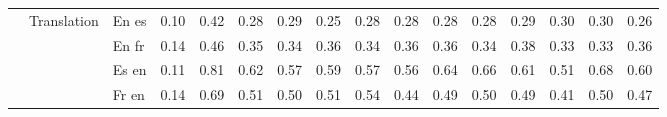\begin{center}
\begin{longtable}{lllrrrrrrrrrrrrr}
\cline{2-16}
 & \multirow[t]{4}{*}{Translation} & En es & 0.10 & 0.42 & 0.28 & 0.29 & 0.25 & 0.28 & 0.28 & 0.28 & 0.28 & 0.29 & 0.30 & 0.30 & 0.26 \\
 &  & En fr & 0.14 & 0.46 & 0.35 & 0.34 & 0.36 & 0.34 & 0.36 & 0.36 & 0.34 & 0.38 & 0.33 & 0.33 & 0.36 \\
 &  & Es en & 0.11 & 0.81 & 0.62 & 0.57 & 0.59 & 0.57 & 0.56 & 0.64 & 0.66 & 0.61 & 0.51 & 0.68 & 0.60 \\
 &  & Fr en & 0.14 & 0.69 & 0.51 & 0.50 & 0.51 & 0.54 & 0.44 & 0.49 & 0.50 & 0.49 & 0.41 & 0.50 & 0.47 \\
\cline{1-16} \cline{2-16}
\bottomrule
\end{longtable}

\end{center}
\twocolumn